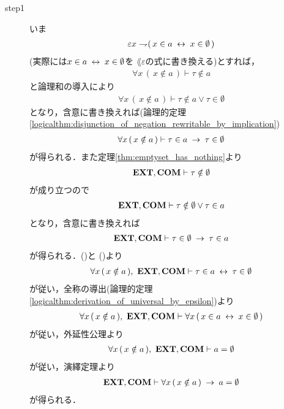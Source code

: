 	\begin{prf}\mbox{}
		\begin{description}
			\item[step1]
				いま
				\begin{align}
					\varepsilon x \rightharpoondown\hspace{-0.25em} (\, x \in a \hspace{0.25em}\leftrightarrow\hspace{0.25em} x \in \emptyset\, )
				\end{align}
				(実際には$x \in a \hspace{0.25em}\leftrightarrow\hspace{0.25em} x \in \emptyset$を
				$\lang{\varepsilon}$の式に書き換える)とすれば，
				\begin{align}
					\forall x\, (\, x \notin a\, ) \vdash \tau \notin a
				\end{align}
				と論理和の導入により
				\begin{align}
					\forall x\, (\, x \notin a\, ) \vdash 
					\tau \notin a \vee \tau \in \emptyset
				\end{align}
				となり，含意に書き換えれば(論理的定理
				\ref{logicalthm:disjunction_of_negation_rewritable_by_implication})
				\begin{align}
					\forall x\, (\, x \notin a\, ) \vdash 
					\tau \in a \hspace{0.25em}\rightarrow\hspace{0.25em} \tau \in \emptyset
					\label{fom:uniqueness_of_emptyset_1}
				\end{align}
				が得られる．また定理\ref{thm:emptyset_has_nothing}より
				\begin{align}
					\mbox{{\bf EXT}},\mbox{\bf COM} \vdash \tau \notin \emptyset
				\end{align}
				が成り立つので
				\begin{align}
					\mbox{{\bf EXT}},\mbox{\bf COM} \vdash \tau \notin \emptyset \vee \tau \in a
				\end{align}
				となり，含意に書き換えれば
				\begin{align}
					\mbox{{\bf EXT}},\mbox{\bf COM} \vdash \tau \in \emptyset \hspace{0.25em}\rightarrow\hspace{0.25em} \tau \in a
					\label{fom:uniqueness_of_emptyset_2}
				\end{align}
				が得られる．()と
				()より
				\begin{align}
					\forall x\, (\, x \notin a\, ),\ \mbox{{\bf EXT}},\mbox{\bf COM} \vdash
					\tau \in a \hspace{0.25em}\leftrightarrow\hspace{0.25em} \tau \in \emptyset
				\end{align}
				が従い，全称の導出(論理的定理\ref{logicalthm:derivation_of_universal_by_epsilon})より
				\begin{align}
					\forall x\, (\, x \notin a\, ),\ \mbox{{\bf EXT}},\mbox{\bf COM} \vdash
					\forall x\, (\, x \in a \hspace{0.25em}\leftrightarrow\hspace{0.25em} x \in \emptyset\, )
				\end{align}
				が従い，外延性公理より
				\begin{align}
					\forall x\, (\, x \notin a\, ),\ \mbox{{\bf EXT}},\mbox{\bf COM} \vdash
					a = \emptyset
				\end{align}
				が従い，演繹定理より
				\begin{align}
					\mbox{{\bf EXT}},\mbox{\bf COM} \vdash
					\forall x\, (\, x \notin a\, ) \hspace{0.25em}\rightarrow\hspace{0.25em} a = \emptyset
				\end{align}
				が得られる．
				

\end{description}
\end{prf}
